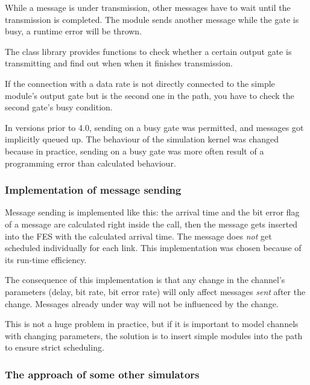 While a message is under transmission, other messages have to wait
until the transmission is completed. The module sends another message while the
gate is busy, a runtime error will be thrown.

The {\opp} class library provides functions to check
whether a certain output gate is transmitting and find out when when
it finishes transmission.

If the connection with a data rate is not directly connected
to the simple module's output gate but is the second
one in the path, you have to check the second gate's busy
condition.

\begin{note}
   In {\opp} versions prior to 4.0, sending on a busy gate was permitted, and
   messages got implicitly queued up. The behaviour of the simulation kernel
   was changed because in practice, sending on a busy gate was more often result
   of a programming error than calculated behaviour.
\end{note}


\subsubsection{Implementation of message sending}

Message sending is implemented like this: the arrival time
and the bit error flag of a message are calculated right inside
the  call, then the message gets inserted into the FES
with the calculated arrival time. The message does \textit{not} get scheduled
individually for each link. This implementation was chosen because of its
run-time efficiency.

\begin{note}
   The consequence of this implementation is that any change in the
   channel's parameters (delay, bit rate, bit error rate) will only affect
   messages \textit{sent} after the change. Messages already under way will not
   be influenced by the change.

   This is not a huge problem in practice, but if it is important to model
   channels with changing parameters, the solution is to insert simple modules
   into the path to ensure strict scheduling.
\end{note}


\subsubsection{The approach of some other simulators}

